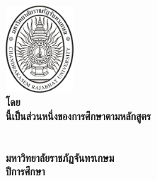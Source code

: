 \makeatletter
\clearpage\pagestyle{empty}
	{\centering
	\fontsize{16}{18.4}\selectfont
		\includegraphics[width=1in]{CRU_LOGO/CRU_Chandra}\\\vspace{\baselineskip}
		\bfseries\@thesistitleThai
	\vfill
	\fontsize{14}{16.1}\selectfont โดย\\\vspace{1.427465\baselineskip}
	\@authorThai
	\vfill
	 \@typeofwritingThai นี้เป็นส่วนหนึ่งของการศึกษาตามหลักสูตร\\
	\@degreeThai\\
	\ifdefined\@majorThai \@majorThai \ifdefined\@departmentThai\space\fi\fi \ifdefined\@departmentThai \@departmentThai\\ \fi
	\@facultyThai\space มหาวิทยาลัยราชภัฏจันทรเกษม\\
	ปีการศึกษา \the\year
	\par}


\cleardoublepage
\newpage


